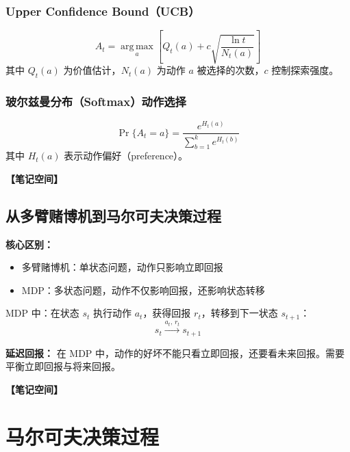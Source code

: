 \documentclass[12pt,a4paper]{article}
\newcommand{\notespace}[1][3cm]{%
  \vspace{#1}%
  \noindent\textbf{【笔记空间】}%
  \vspace{#1}%
}
\newcommand{\1}{\mathbf{1}}
\newcommand{\argmax}{\operatorname*{arg\,max}}
\begin{document}
\subsubsection*{Upper Confidence Bound（UCB）}

\begin{equation}
A_t=\argmax_a \left[ Q_t(a)+c\sqrt{\frac{\ln t}{N_t(a)}} \right]
\end{equation}
其中 $Q_t(a)$ 为价值估计，$N_t(a)$ 为动作 $a$ 被选择的次数，$c$ 控制探索强度。

\subsubsection*{玻尔兹曼分布（Softmax）动作选择}

\begin{equation}
\Pr\{A_t=a\}=\frac{e^{H_t(a)}}{\sum_{b=1}^{k} e^{H_t(b)}}
\end{equation}
其中 $H_t(a)$ 表示动作偏好（preference）。

\notespace[2cm]

\subsection{从多臂赌博机到马尔可夫决策过程}

\begin{notebox}
\textbf{核心区别：}
\begin{itemize}[leftmargin=1.5em]
  \item 多臂赌博机：单状态问题，动作只影响立即回报
  \item MDP：多状态问题，动作不仅影响回报，还影响状态转移
\end{itemize}
\end{notebox}

MDP 中：在状态 $s_t$ 执行动作 $a_t$，获得回报 $r_t$，转移到下一状态 $s_{t+1}$：
\begin{equation}
s_t \xrightarrow{a_t,\, r_t} s_{t+1}
\end{equation}

\textbf{延迟回报：} 在 MDP 中，动作的好坏不能只看立即回报，还要看未来回报。需要平衡立即回报与将来回报。

\notespace[3cm]

\newpage

\section{马尔可夫决策过程}
\end{document}
